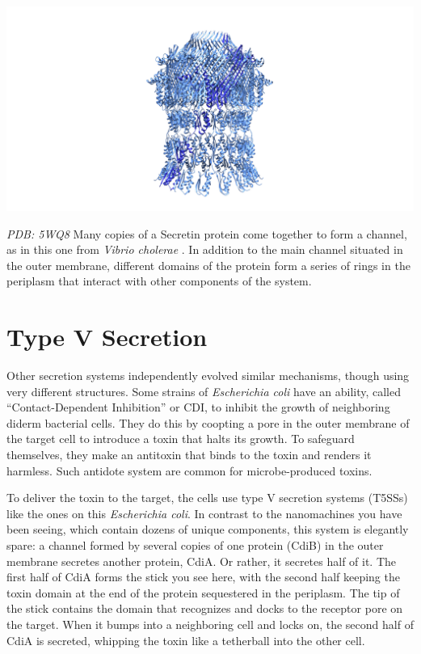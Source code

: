 \documentclass[]{tufte-book}
\begin{document}
\includegraphics{img/schematics/9_4_2}

\emph{PDB: 5WQ8} Many copies of a Secretin protein come together to form
a channel, as in this one from \emph{Vibrio cholerae} \citep{yan2017a}.
In addition to the main channel situated in the outer membrane,
different domains of the protein form a series of rings in the periplasm
that interact with other components of the system.

\section{Type V Secretion}\label{type-v-secretion}

Other secretion systems independently evolved similar mechanisms, though
using very different structures. Some strains of \emph{Escherichia coli}
have an ability, called ``Contact-Dependent Inhibition'' or CDI, to
inhibit the growth of neighboring diderm bacterial cells. They do this
by coopting a pore in the outer membrane of the target cell to introduce
a toxin that halts its growth. To safeguard themselves, they make an
antitoxin that binds to the toxin and renders it harmless. Such antidote
system are common for microbe-produced toxins.

To deliver the toxin to the target, the cells use type V secretion
systems (T5SSs) like the ones on this \emph{Escherichia coli}. In
contrast to the nanomachines you have been seeing, which contain dozens
of unique components, this system is elegantly spare: a channel formed
by several copies of one protein (CdiB) in the outer membrane secretes
another protein, CdiA. Or rather, it secretes half of it. The first half
of CdiA forms the stick you see here, with the second half keeping the
toxin domain at the end of the protein sequestered in the periplasm. The
tip of the stick contains the domain that recognizes and docks to the
receptor pore on the target. When it bumps into a neighboring cell and
locks on, the second half of CdiA is secreted, whipping the toxin like a
tetherball into the other cell.
\end{document}
